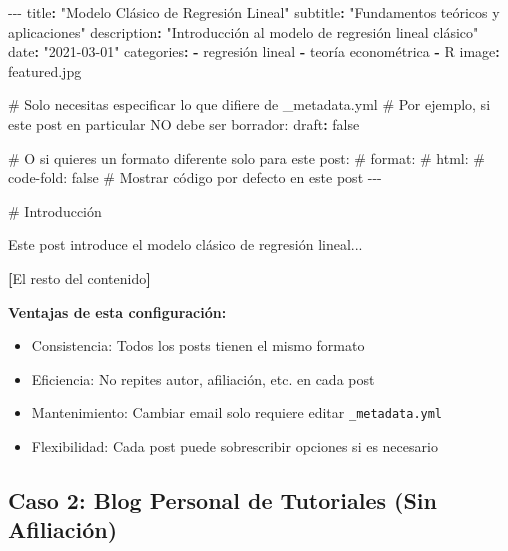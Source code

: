 \documentclass[
  doc,
  floatsintext,
  longtable,
  a4paper,
  nolmodern,
  notxfonts,
  notimes,
  12pt,
  colorlinks=true,linkcolor=blue,citecolor=blue,urlcolor=blue]{apa7}
\newenvironment{Shaded}{\begin{snugshade}}{\end{snugshade}}
\newcommand{\AttributeTok}[1]{\textcolor[rgb]{0.40,0.45,0.13}{#1}}
\newcommand{\CharTok}[1]{\textcolor[rgb]{0.13,0.47,0.30}{#1}}
\newcommand{\CommentTok}[1]{\textcolor[rgb]{0.37,0.37,0.37}{#1}}
\newcommand{\FunctionTok}[1]{\textcolor[rgb]{0.28,0.35,0.67}{#1}}
\newcommand{\KeywordTok}[1]{\textcolor[rgb]{0.00,0.23,0.31}{\textbf{#1}}}
\newcommand{\PreprocessorTok}[1]{\textcolor[rgb]{0.68,0.00,0.00}{#1}}
\newcommand{\StringTok}[1]{\textcolor[rgb]{0.13,0.47,0.30}{#1}}
\providecommand{\tightlist}{%
  \setlength{\itemsep}{0pt}\setlength{\parskip}{0pt}}
\begin{document}
\begin{Shaded}
\begin{Highlighting}[]
\PreprocessorTok{{-}{-}{-}}
\FunctionTok{title}\KeywordTok{:}\AttributeTok{ }\StringTok{"Modelo Clásico de Regresión Lineal"}
\FunctionTok{subtitle}\KeywordTok{:}\AttributeTok{ }\StringTok{"Fundamentos teóricos y aplicaciones"}
\FunctionTok{description}\KeywordTok{:}\AttributeTok{ }\StringTok{"Introducción al modelo de regresión lineal clásico"}
\FunctionTok{date}\KeywordTok{:}\AttributeTok{ }\StringTok{"2021{-}03{-}01"}
\FunctionTok{categories}\KeywordTok{:}
\AttributeTok{  }\KeywordTok{{-}}\AttributeTok{ regresión lineal}
\AttributeTok{  }\KeywordTok{{-}}\AttributeTok{ teoría econométrica}
\AttributeTok{  }\KeywordTok{{-}}\AttributeTok{ R}
\FunctionTok{image}\KeywordTok{:}\AttributeTok{ featured.jpg}

\CommentTok{\# Solo necesitas especificar lo que difiere de \_metadata.yml}
\CommentTok{\# Por ejemplo, si este post en particular NO debe ser borrador:}
\FunctionTok{draft}\KeywordTok{:}\AttributeTok{ }\CharTok{false}

\CommentTok{\# O si quieres un formato diferente solo para este post:}
\CommentTok{\# format:}
\CommentTok{\#   html:}
\CommentTok{\#     code{-}fold: false    \# Mostrar código por defecto en este post}
\PreprocessorTok{{-}{-}{-}}

\CommentTok{\# Introducción}

\AttributeTok{Este post introduce el modelo clásico de regresión lineal...}

\KeywordTok{[}\AttributeTok{El resto del contenido}\KeywordTok{]}
\end{Highlighting}
\end{Shaded}

\textbf{Ventajas de esta configuración:}

\begin{itemize}
\tightlist
\item
  Consistencia: Todos los posts tienen el mismo formato
\item
  Eficiencia: No repites autor, afiliación, etc. en cada post
\item
  Mantenimiento: Cambiar email solo requiere editar
  \texttt{\_metadata.yml}
\item
  Flexibilidad: Cada post puede sobrescribir opciones si es necesario
\end{itemize}

\subsection{Caso 2: Blog Personal de Tutoriales (Sin
Afiliación)}\label{caso-2-blog-personal-de-tutoriales-sin-afiliaciuxf3n}
\end{document}
